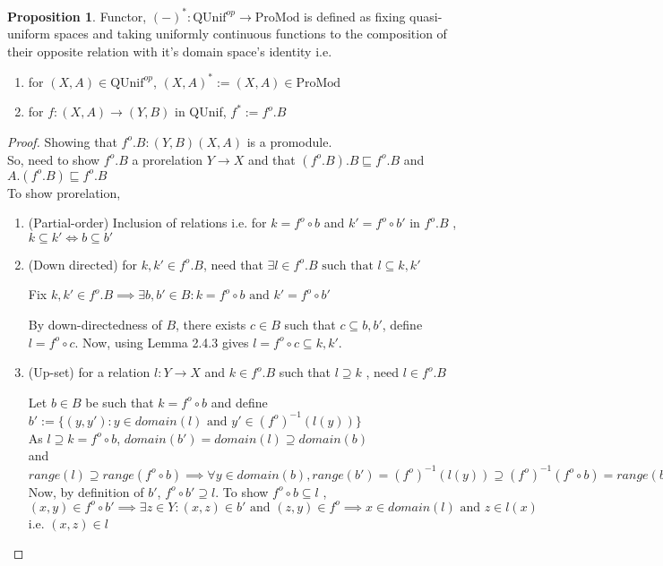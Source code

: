 \documentclass[18pt,a4paper]{article}
\makeatletter
\theoremstyle{definition}
\newtheorem{proop}{Proposition}[section]
\newcommand{\carrow}{}%
\DeclareRobustCommand{\carrow}{%
	\mathrel{\vphantom{\rightarrow}\mathpalette\circle@arrow\relax}%
}
\newcommand{\circle@arrow}[2]{%
	\m@th
	\ooalign{%
		\hidewidth$#1\circ\mkern1mu$\hidewidth\cr
	$#1\longrightarrow$\cr}%
}
\makeatother
\begin{document}
\begin{proop} Functor, $(-)^*:\text{QUnif}^{op} \to \text{ProMod}$ is
	defined as fixing quasi-uniform spaces and taking
	uniformly continuous functions to the composition of their opposite
	relation with it's domain space's identity i.e.
	\begin{enumerate}[label=(\alph*)]
		\item for $(X,A) \in \text{QUnif}^{op}$, $(X,A)^*:=(X,A) \in \text{ProMod}$
		\item for $f:(X,A) \to (Y,B)$ in QUnif,
			$f^* := f^o .B$
	\end{enumerate}
\end{proop}
\begin{proof}
Showing that $f^o .B: (Y,B) \carrow (X,A)$ is a promodule.\\
	So, need to show $f^o .B$ a prorelation $Y \to X$
	and that $(f^o .B).B \sqsubseteq f^o .B$ and $A.(f^o .B) \sqsubseteq f^o .B$ \\
	To show prorelation, \begin{enumerate}[label=(\roman*)]
		\item (Partial-order) Inclusion of relations i.e. for $k=f^o \circ b$ and
			$k'=f^o \circ b'$ in $f^o .B$ , $k \subseteq k' \iff b \subseteq b'$
		\item (Down directed) for $k,k' \in f^o .B$, need that $\exists l \in f^o .B
			\text{ such that } l \subseteq k,k'$

			Fix $k,k' \in f^o .B \implies \exists b,b' \in B : k=f^o \circ b \text{ and }
			k' = f^o \circ b'$

			By down-directedness of $B$, there exists $c \in B$ such that
			$ c \subseteq b,b'$, define $l=f^o \circ c$.
			Now, using Lemma 2.4.3 gives  $l= f^o \circ c \subseteq k,k'$.
		\item (Up-set) for a relation $l:Y \to X$ and $k \in f^o .B$ such that $l \supseteq k$
			, need $l \in f^o .B$

			Let $b\in B$ be such that $k=f^o \circ b$ and define
			$b':=\{(y,y'): y \in domain(l) \text{ and } y' \in (f^o)^{-1}(l(y))\}$\\
				As $l\supseteq k=f^o \circ b$, $domain(b')=domain(l)\supseteq domain(b)$
				\\ and $range(l) \supseteq range(f^o \circ b)\implies
				\forall y \in domain(b), range (b')=(f^o )^{-1}(l(y)) \supseteq (f^o)^{-1}(f^o \circ b ) = range(b)$\\
				Now, by definition of $b'$, $f^o \circ b' \supseteq l$. To show
				$f^o \circ b \subseteq l$ , \\
				$(x,y)\in f^o \circ b' \implies \exists z \in Y: (x,z)\in b' \text{ and }
				(z,y) \in f^o \implies x \in domain(l) \text{ and } z \in l(x)$ i.e.
				$(x,z) \in l$


\end{enumerate}
\end{proof}
\end{document}
